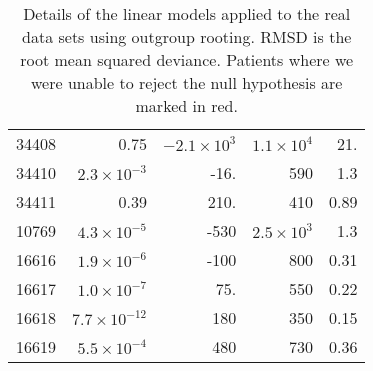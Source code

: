 \documentclass[12pt]{article}
\newcommand{\badpat}[1]{\rowcolor{badpatcol}#1}
\begin{document}
\begin{table*}[!ht]
\begin{center}
\begin{tabular}{lrrrr}
\badpat{34408 & 0.75 & $-2.1 \times 10^{3}$ & $1.1 \times 10^{4}$ & 21.} \\
34410 & $2.3 \times 10^{-3}$ & -16. & 590 & 1.3 \\
\badpat{34411 & 0.39 & 210. & 410 & 0.89} \\
10769 & $4.3 \times 10^{-5}$ & -530 & $2.5 \times 10^3$ & 1.3 \\
16616 & $1.9 \times 10^{-6}$ & -100 & 800 & 0.31 \\
16617 & $1.0 \times 10^{-7}$ & 75. & 550 & 0.22 \\
16618 & $7.7 \times 10^{-12}$ & 180 & 350 & 0.15 \\
16619 & $5.5 \times 10^{-4}$ & 480 & 730 & 0.36 \\
\hline
\end{tabular}
\end{center}
  \caption{Details of the linear models applied to the real data sets using outgroup rooting. RMSD is the root mean squared deviance. Patients where we were unable to reject the null hypothesis are marked in red.
   }\label{tab:patientserrorogr} 
\end{table*}
\end{document}
